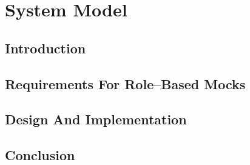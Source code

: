 \chapter{System Model}

\section{Introduction}

\section{Requirements For Role--Based Mocks}

\section{Design And Implementation}

\section{Conclusion}